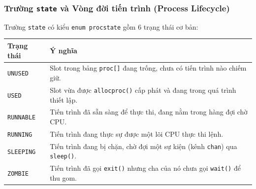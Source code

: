 \subsubsection{Trường \texttt{state} và Vòng đời tiến trình (Process Lifecycle)}
Trường \texttt{state} có kiểu \texttt{enum procstate} gồm 6 trạng thái cơ bản:
\begin{center}
\begin{tabular}{|l|l|}
\hline
\textbf{Trạng thái} & \textbf{Ý nghĩa} \\ \hline
\texttt{UNUSED} & Slot trong bảng \texttt{proc[]} đang trống, chưa có tiến trình nào chiếm giữ. \\ \hline
\texttt{USED} & Slot vừa được \texttt{allocproc()} cấp phát và đang trong quá trình thiết lập. \\ \hline
\texttt{RUNNABLE} & Tiến trình đã sẵn sàng để thực thi, đang nằm trong hàng đợi chờ CPU. \\ \hline
\texttt{RUNNING} & Tiến trình đang thực sự được một lõi CPU thực thi lệnh. \\ \hline
\texttt{SLEEPING} & Tiến trình đang bị chặn, chờ đợi một sự kiện (kênh \texttt{chan}) qua \texttt{sleep()}. \\ \hline
\texttt{ZOMBIE} & Tiến trình đã gọi \texttt{exit()} nhưng cha của nó chưa gọi \texttt{wait()} để thu gom. \\ \hline
\end{tabular}
\end{center}

